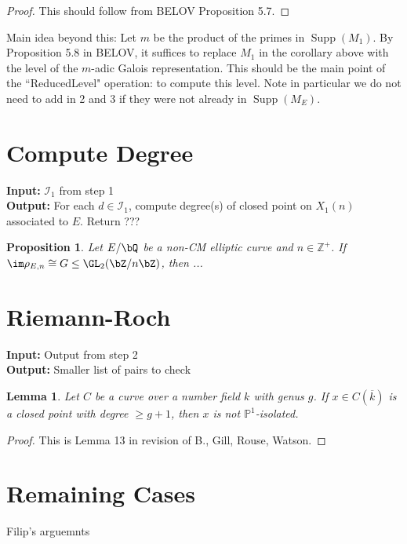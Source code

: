 \documentclass[11pt,reqno]{amsart}
\theoremstyle{plain}
\newtheorem{lemma}[theorem]{Lemma}
\newtheorem{proposition}[theorem]{Proposition}
\theoremstyle{definition}
\newcommand{\Supp}{\operatorname{Supp}}
\newcommand{\Q}{\bQ}
\newcommand{\Z}{\bZ}
\begin{document}
\begin{proof}
This should follow from BELOV Proposition 5.7.
\end{proof}

Main idea beyond this: Let $m$ be the product of the primes in $\Supp(M_1)$. By Proposition 5.8 in BELOV, it suffices to replace $M_1$ in the corollary above with the level of the $m$-adic Galois representation. This should be the main point of the ``ReducedLevel" operation: to compute this level. Note in particular we do not need to add in 2 and 3 if they were not already in $\Supp(M_E)$.

\section{Compute Degree}

\noindent \textbf{Input:} $\mathcal{I}_1$ from step 1\\
\textbf{Output:} For each $d \in \mathcal{I}_1$, compute degree(s) of closed point on $X_1(n)$ associated to $E$. Return ???

\begin{proposition}
Let $E/\Q$ be a non-CM elliptic curve and $n \in \mathbb{Z}^+$. If $\im \rho_{E,n} \cong G \leq \GL_2(\Z/n\Z)$, then ...
\end{proposition}



\section{Riemann-Roch}

\noindent \textbf{Input:} Output from step 2\\
\textbf{Output:} Smaller list of pairs to check

\begin{lemma}
Let $C$ be a curve over a number field $k$ with genus $g$. If $x \in C(\overline{k})$ is a closed point with degree
$\geq g+1$, then $x$ is not $\mathbb{P}^{1}$-isolated.
\end{lemma}

\begin{proof}
This is Lemma 13 in revision of B., Gill, Rouse, Watson.
\end{proof}

\section{Remaining Cases}

Filip's arguemnts
\end{document}
